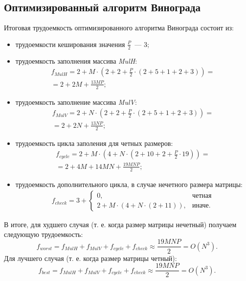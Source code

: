 \subsection{Оптимизированный алгоритм Винограда}
Итоговая трудоемкость оптимизированного алгоритма Винограда состоит из:
\begin{itemize}
	\item трудоемкости кеширования значения $\frac{P}{2}$~--- 3;
	\item трудоемкость заполнения массива \textit{MulH}:
	\begin{equation}
		\begin{gathered}
			f_{MulH} = 2 + M \cdot (2 + 2 + \frac{P}{2} \cdot (2 + 5 + 1 + 2 + 3)) = \\
			= 2 + 2M + \frac{13MP}{2};
		\end{gathered}
	\end{equation}
	\item трудоемкость заполнение массива \textit{MulV}:
	\begin{equation}
		\begin{gathered}
			f_{MulV} = 2 + N \cdot (2 + 2 + \frac{P}{2} \cdot (2 + 5 + 1 + 2 + 3)) = \\
			= 2 + 2N + \frac{13NP}{2};
		\end{gathered}
	\end{equation}
	\item трудоемкость цикла заполения для четных размеров:
	\begin{equation}
		\begin{gathered}
			f_{cycle} = 2 + M \cdot (4 + N \cdot (2 + 10 + 2 + \frac{P}{2} \cdot 19)) = \\
			= 2 + 4M + 14MN + \frac{19MNP}{2};
		\end{gathered}
	\end{equation}
	\item трудоемкость дополнительного цикла, в случае нечетного размера матрицы:
	\begin{equation}
		\begin{gathered}
			f_{check} = 3 + 
			\begin{cases}
				0, & \text{четная} \\
				2 + M \cdot (4 + N \cdot (2 + 11)), & \text{иначе}.
			\end{cases}
		\end{gathered}  
	\end{equation}
\end{itemize}
В итоге, для худшего случая (т. е. когда размер матрицы нечетный) получаем следующую трудоемкость:
\begin{equation}
	f_{worst} = f_{MulH} + f_{MulV} + f_{cycle} + f_{check} \approx \frac{19MNP}{2} = O(N^3).
\end{equation}
Для лучшего случая (т. е. когда размер матрицы четный):
\begin{equation}
	f_{best} = f_{MulH} + f_{MulV} + f_{cycle} + f_{check} \approx \frac{19MNP}{2} = O(N^3).
\end{equation}


